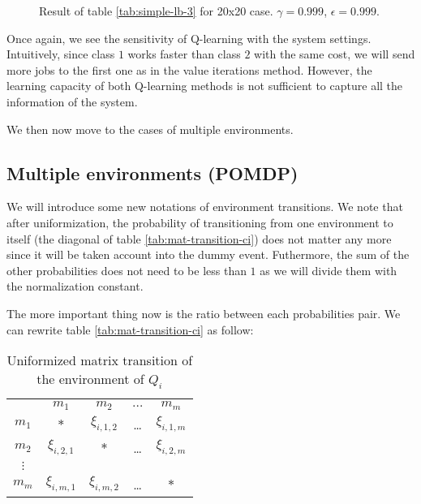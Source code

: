 \documentclass[
  a4paper, xcolor = usenames,dvipsnames]{article}
\theoremstyle{definition}
\theoremstyle{definition}
\theoremstyle{definition}
\theoremstyle{definition}
\theoremstyle{remark}
\begin{document}
\begin{figure}

{\centering {}

}

\caption{Result of table \ref{tab:simple-lb-3} for 20x20 case. \(\gamma = 0.999\), \(\epsilon = 0.999\).}\label{fig:20x20-simple-lb-3}
\end{figure}

Once again, we see the sensitivity of Q-learning with the system settings. Intuitively, since class \(1\) works faster than class \(2\) with the same cost, we will send more jobs to the first one as in the value iterations method. However, the learning capacity of both Q-learning methods is not sufficient to capture all the information of the system.

We then now move to the cases of multiple environments.

\hypertarget{multiple-environments-pomdp}{%
\subsection{Multiple environments (POMDP)}\label{multiple-environments-pomdp}}

We will introduce some new notations of environment transitions. We note that after uniformization, the probability of transitioning from one environment to itself (the diagonal of table \ref{tab:mat-transition-ci}) does not matter any more since it will be taken account into the dummy event. Futhermore, the sum of the other probabilities does not need to be less than \(1\) as we will divide them with the normalization constant.

The more important thing now is the ratio between each probabilities pair. We can rewrite table \ref{tab:mat-transition-ci} as follow:

\begin{table}[!htbp]
\caption{Uniformized matrix transition of the environment of $Q_{i}$}
\begin{center}
\begin{tabular}{c c c c c}
    \hline
    & $m_{1}$ & $m_{2}$ & $\dots$ & $m_{m}$ \\
    $m_{1}$ & $*$ & $\xi_{i, 1, 2}$ & \dots & $\xi_{i, 1, m}$ \\
    $m_{2}$ & $\xi_{i, 2, 1}$ & $*$ & \dots & $\xi_{i, 2, m}$ \\
    $\vdots$ & & & & \\
    $m_{m}$ & $\xi_{i, m, 1}$ & $\xi_{i, m, 2}$ & \dots & $*$ \\
    \hline
\end{tabular}
\end{center}
\label{tab:uni-mat-transition-ci}
\end{table}
\end{document}
